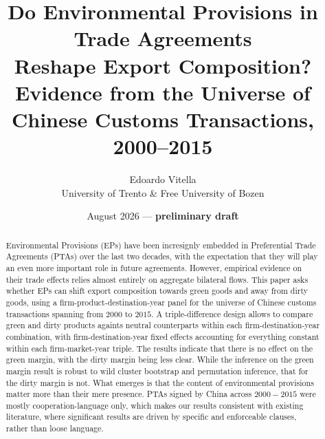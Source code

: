 \documentclass[12pt]{article}
\title{Do Environmental Provisions in Trade Agreements\\ Reshape Export Composition?\\
\large Evidence from the Universe of Chinese Customs Transactions, 2000--2015}
\author{Edoardo Vitella\\
\small University of Trento \& Free University of Bozen}
\date{August 2026 --- \textbf{preliminary draft}}
\begin{document}
\maketitle

\begin{abstract}
\noindent
\noindent
Environmental Provisions (EPs) have been incresignly embedded in Preferential Trade Agreements (PTAs) over the last two decades, with the expectation that they will play an even more important role in future agreements. However, empirical evidence on their trade effects relies almost entirely on aggregate bilateral flows. This paper asks whether EPs can shift export composition towards green goods and away from dirty goods, using a firm-product-destination-year panel for the universe of Chinese customs transactions spanning from $2000$ to $2015$. A triple-difference design allows to compare green and dirty products againts neutral counterparts within each firm-destination-year combination, with firm-destination-year fixed effects accounting for everything constant within each firm-market-year triple. The results indicate that there is no effect on the green margin, with the dirty margin being less clear. While the inference on the green margin result is robust to wild cluster bootstrap and permutation inference, that for the dirty margin is not. What emerges is that the content of environmental provisions matter more than their mere presence. PTAs signed by China across $2000-2015$ were mostly cooperation-language only, which makes our results consistent with existing literature, where significant results are driven by specific and enforceable clauses, rather than loose language.







\end{abstract}
\end{document}
